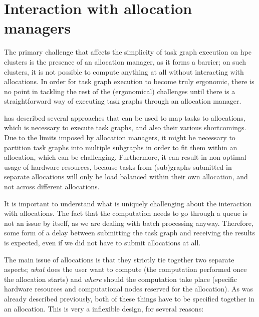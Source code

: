 

\section{Interaction with allocation managers}
The primary challenge that affects the simplicity of task graph execution on \gls{hpc}
clusters is the presence of an allocation manager, as it forms a barrier; on such clusters, it is
not possible to compute anything at all without interacting with allocations. In order for task
graph execution to become truly ergonomic, there is no point in tackling the rest of the
(ergonomical) challenges until there is a straightforward way of executing task graphs through an
allocation manager.

 has described several approaches that can be used to map tasks to
allocations, which is necessary to execute task graphs, and also their various shortcomings. Due to
the limits imposed by allocation managers, it might be necessary to partition task graphs into
multiple subgraphs in order to fit them within an allocation, which can be challenging.
Furthermore, it can result in non-optimal usage of hardware resources, because tasks from
(sub)graphs submitted in separate allocations will only be load balanced within their own
allocation, and not across different allocations.

It is important to understand what is uniquely challenging about the interaction with allocations.
The fact that the computation needs to go through a queue is not an issue by itself, as we are
dealing with batch processing anyway. Therefore, some form of a delay between submitting the task
graph and receiving the results is expected, even if we did not have to submit allocations at all.

The main issue of allocations is that they strictly tie together two separate aspects;
\emph{what} does the user want to compute (the computation performed once the
allocation starts) and \emph{where} should the computation take place (specific hardware
resources and computational nodes reserved for the allocation). As was already described
previously, both of these things have to be specified together in an allocation. This is very a
inflexible design, for several reasons:

